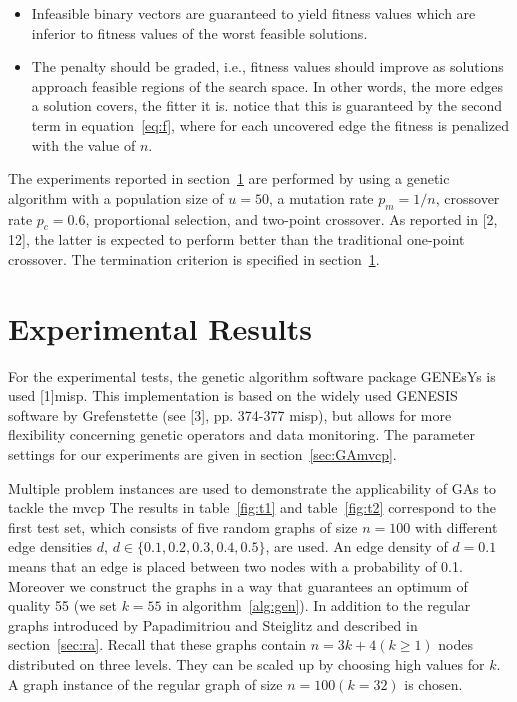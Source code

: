\documentclass[12pt]{article}
\begin{document}
\begin{itemize}
\vspace{-3mm}

\item Infeasible binary vectors are guaranteed to yield fitness
values which are inferior to fitness values of
the worst feasible solutions.

\item The penalty should be graded, i.e., fitness values
should improve as solutions approach feasible regions
of the search space. In other words, the more edges a solution
covers, the fitter it is. notice that this is guaranteed by the
second term in equation~\ref{eq:f}, where for each uncovered edge
the fitness is penalized with the value of $n$.
\end{itemize}

The experiments reported in section~\ref{sec:er} are performed
by using a genetic algorithm with a population size of
$u = 50$, a mutation rate $p_m = 1/n$, crossover rate
$p_c = 0.6$, proportional selection, and two-point crossover.
As reported in [2, 12], the latter is expected to perform
better than the traditional one-point crossover.
The termination criterion is specified in section~\ref{sec:er}.


\section{Experimental Results}
\label{sec:er}
\setcounter{figure}{0}
For the experimental tests,
the genetic algorithm software package GENEsYs is used [1]misp.
This implementation is based on the widely used GENESIS software by Grefenstette
(see [3], pp. 374-377 misp), but allows for more 
flexibility concerning genetic operators and data monitoring.
The parameter settings for our experiments are
given in section~\ref{sec:GAmvcp}.


Multiple problem instances are used to demonstrate the applicability of GAs to tackle the mvcp
The results in table~\ref{fig:t1}
and table~\ref{fig:t2} correspond to the first test set, which consists of
five random graphs of size $n = 100$ with different
edge densities $d$, $d \in \{0.1, 0.2, 0.3, 0.4, 0.5\}$, are used.
An edge density of $d = 0.1$ means that an edge is placed between two
nodes with a probability of 0.1.
Moreover we construct the graphs in a way that guarantees an optimum of quality 55
(we set $k = 55$ in algorithm~\ref{alg:gen}).
In addition to the regular graphs introduced by
Papadimitriou and Steiglitz and described in section~\ref{sec:ra}.
Recall that these graphs contain $n=3k+4 (k \geq 1)$ nodes distributed on three levels.
They can be scaled up by choosing high values for $k$.
A graph instance of the regular graph of size $n = 100 (k=32)$ is chosen.
\end{document}
